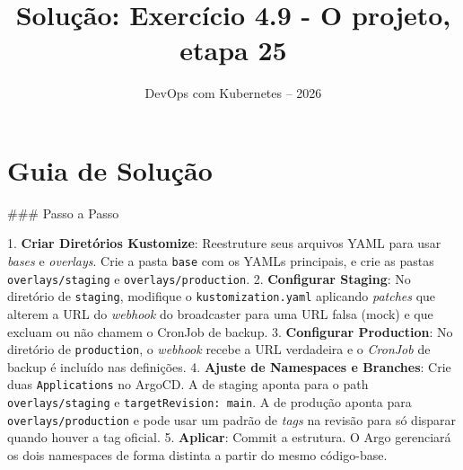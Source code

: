 \documentclass[11pt,a4paper]{article}
\title{\color{secondary}\Huge\textbf{Solução: Exercício 4.9 - O projeto, etapa 25}}
\author{\color{primary}DevOps com Kubernetes -- 2026}
\date{}
\begin{document}
\maketitle

\section*{\color{primary}Guia de Solução}
\begin{tcolorbox}[colback=green!5!white,colframe=green!60!black,title=Resolução Passo a Passo]
### Passo a Passo

1. \textbf{Criar Diretórios Kustomize}: Reestruture seus arquivos YAML para usar \textit{bases} e \textit{overlays}. Crie a pasta \texttt{base} com os YAMLs principais, e crie as pastas \texttt{overlays/staging} e \texttt{overlays/production}.
2. \textbf{Configurar Staging}: No diretório de \texttt{staging}, modifique o \texttt{kustomization.yaml} aplicando \textit{patches} que alterem a URL do \textit{webhook} do broadcaster para uma URL falsa (mock) e que excluam ou não chamem o CronJob de backup.
3. \textbf{Configurar Production}: No diretório de \texttt{production}, o \textit{webhook} recebe a URL verdadeira e o \textit{CronJob} de backup é incluído nas definições.
4. \textbf{Ajuste de Namespaces e Branches}: Crie duas \texttt{Applications} no ArgoCD. A de staging aponta para o path \texttt{overlays/staging} e \texttt{targetRevision: main}. A de produção aponta para \texttt{overlays/production} e pode usar um padrão de \textit{tags} na revisão para só disparar quando houver a tag oficial.
5. \textbf{Aplicar}: Commit a estrutura. O Argo gerenciará os dois namespaces de forma distinta a partir do mesmo código-base.
\end{tcolorbox}
\end{document}
